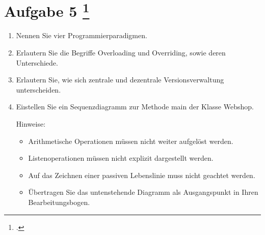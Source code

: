 \documentclass{lehramt-informatik-aufgabe}
\begin{document}
\section{Aufgabe 5
\footcite{66116:2021:03}}

\begin{enumerate}


\item Nennen Sie vier Programmierparadigmen.


\item Erlautern Sie die Begriffe Overloading und Overriding, sowie deren
Unterschiede.


\item Erlautern Sie, wie sich zentrale und dezentrale Versionsverwaltung
unterscheiden.


\item Eiıstellen Sie ein Sequenzdiagramm zur Methode main der Klasse
Webshop.

Hinweise:
\begin{itemize}
\item Arithmetische Operationen müssen nicht weiter aufgelöst werden.

\item Listenoperationen müssen nicht explizit dargestellt werden.

\item Auf das Zeichnen einer passiven Lebenslinie muss nicht geachtet werden.

\item Übertragen Sie das untenstehende Diagramm als Ausgangspunkt in Ihren Bearbeitungsbogen.
\end{itemize}

\end{enumerate}

\end{document}
